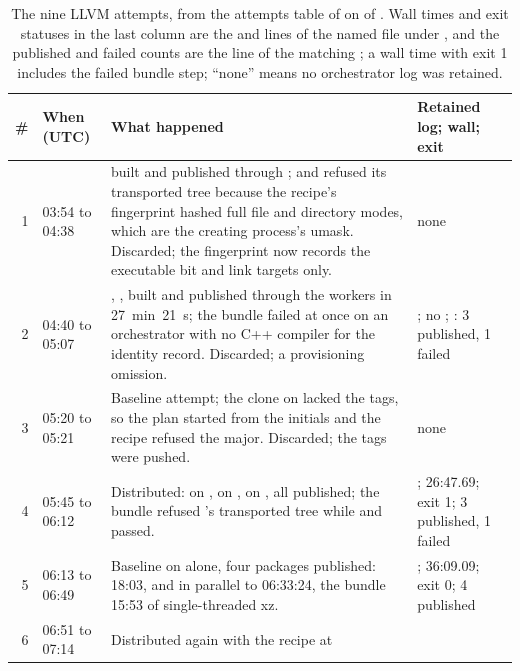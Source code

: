 \begin{table}[!htp]
\centering\footnotesize
\caption{The nine LLVM attempts, from the attempts table of
\protect{} on  of
\protect{}. Wall times and exit statuses in
the last column are the  and  lines of the named  file under
\protect{},
and the published and failed counts are the  line of the matching
; a wall time with exit 1 includes the failed bundle step;
``none'' means no orchestrator log was retained.}
\label{tab:eval:llvm-attempts}
\begin{tabular}{@{}rL{1.5cm}L{6.6cm}L{4.4cm}@{}}
\toprule
\# & When (UTC) & What happened & Retained log; wall; exit \\
 & 03:54 to 04:38 &  built and published through ;
 and  refused its transported tree because the recipe's
fingerprint hashed full file and directory modes, which are the creating
process's umask. Discarded; the fingerprint now records the executable bit and
link targets only. & none \\
2 & 04:40 to 05:07 & , ,  built and published
through the workers in 27~min~21~s; the  bundle failed at once
on an orchestrator with no C++ compiler for the identity record. Discarded; a
provisioning omission. & ; no ; :
3 published, 1 failed \\
3 & 05:20 to 05:21 & Baseline attempt; the clone on  lacked the
 tags, so the plan started from the initials and the
recipe refused the major. Discarded; the tags were pushed. & none \\
4 & 05:45 to 06:12 & Distributed:  on ,  on
,  on , all published; the bundle refused
's transported tree while  and  passed. &
; 26:47.69; exit 1; 3 published, 1 failed \\
5 & 06:13 to 06:49 & Baseline on  alone, four packages published:
 18:03,  and  in parallel to 06:33:24, the
bundle 15:53 of single-threaded xz. & ; 36:09.09; exit 0;
4 published \\
6 & 06:51 to 07:14 & Distributed again with the recipe at 

\end{tabular}
\end{table}
